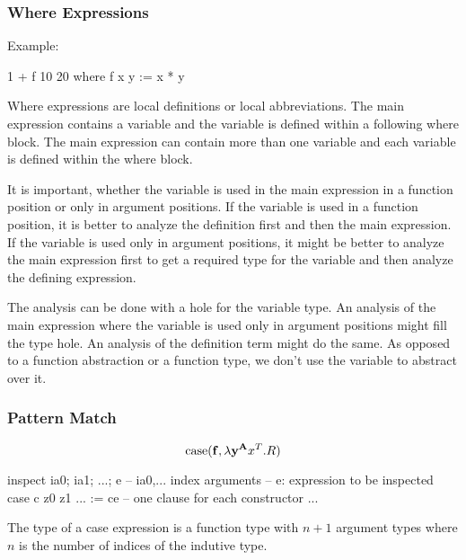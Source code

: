 \vskip 5mm
\subsubsection{Where Expressions}

Example:

\begin{alba}
    1 + f 10 20 where
        f x y := x * y
\end{alba}

Where expressions are local definitions or local abbreviations. The main
expression contains a variable and the variable is defined within a following
where block. The main expression can contain more than one variable and each
variable is defined within the where block.

It is important, whether the variable is used in the main expression in a
function position or only in argument positions. If the variable is used in a
function position, it is better to analyze the definition first and then the
main expression. If the variable is used only in argument positions, it might be
better to analyze the main expression first to get a required type for the
variable and then analyze the defining expression.

The analysis can be done with a hole for the variable type. An analysis of the
main expression where the variable is used only in argument positions might fill
the type hole. An analysis of the definition term might do the same. As opposed
to a function abstraction or a function type, we don't use the variable to
abstract over it.





\vskip 5mm
\subsubsection{Pattern Match}

$$
    \text{case} (\mathbf{f}, \lambda \mathbf{y}^{\mathbf{A}} x^T . R)
$$


\begin{alba}
    inspect
        ia0; ia1; ...; e    -- ia0,... index arguments
                            -- e: expression to be inspected
    case
        c z0 z1 ... := ce       -- one clause for each constructor
        ...
\end{alba}

The type of a case expression is a function type with $n + 1$ argument types
where $n$ is the number of indices of the indutive type.

